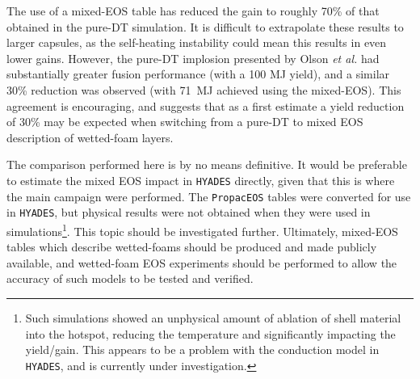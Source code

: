 The use of a mixed-EOS table has reduced the gain to roughly 70\% of that obtained in the pure-DT simulation. It is difficult to extrapolate these results to larger capsules, as the self-heating instability could mean this results in even lower gains. However, the pure-DT implosion presented by Olson \textit{et al.} \cite{Olson2020a} had substantially greater fusion performance (with a 100 MJ yield), and a similar 30\% reduction was observed (with 71~MJ achieved using the mixed-EOS). This agreement is encouraging, and suggests that as a first estimate a yield reduction of 30\% may be expected when switching from a pure-DT to mixed EOS description of wetted-foam layers.

The comparison performed here is by no means definitive. It would be preferable to estimate the mixed EOS impact in \texttt{HYADES} directly, given that this is where the main campaign were performed. The \texttt{PropacEOS} tables were converted for use in \texttt{HYADES}, but physical results were not obtained when they were used in simulations\footnote{Such simulations showed an unphysical amount of ablation of shell material into the hotspot, reducing the temperature and significantly impacting the yield/gain. This appears to be a problem with the conduction model in \texttt{HYADES}, and is currently under investigation.}. This topic should be investigated further. Ultimately, mixed-EOS tables which describe wetted-foams should be produced and made publicly available, and wetted-foam EOS experiments should be performed to allow the accuracy of such models to be tested and verified.


